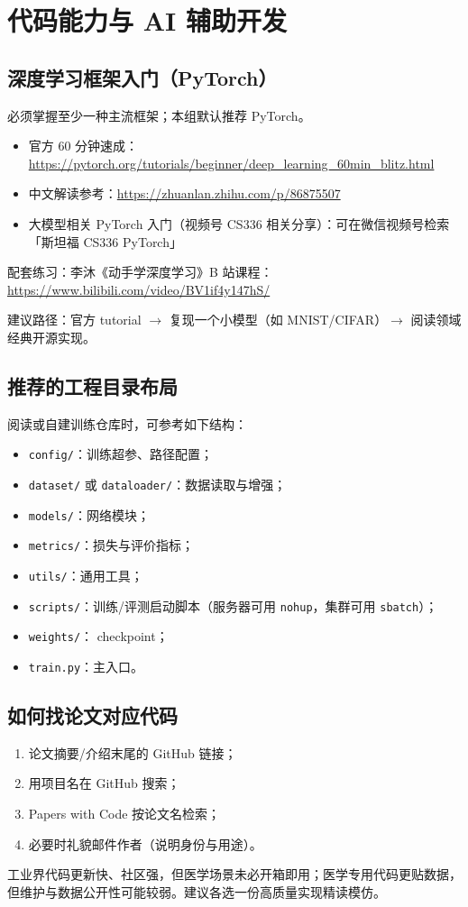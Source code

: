\section{代码能力与 AI 辅助开发}

\subsection{深度学习框架入门（PyTorch）}
必须掌握至少一种主流框架；本组默认推荐 PyTorch。
\begin{itemize}
  \item 官方 60 分钟速成：\url{https://pytorch.org/tutorials/beginner/deep_learning_60min_blitz.html}
  \item 中文解读参考：\url{https://zhuanlan.zhihu.com/p/86875507}
  \item 大模型相关 PyTorch 入门（视频号 CS336 相关分享）：可在微信视频号检索「斯坦福 CS336 PyTorch」
\end{itemize}
配套练习：李沐《动手学深度学习》B 站课程：\\
\url{https://www.bilibili.com/video/BV1if4y147hS/}

建议路径：官方 tutorial $\rightarrow$ 复现一个小模型（如 MNIST/CIFAR）$\rightarrow$ 阅读领域经典开源实现。

\subsection{推荐的工程目录布局}
阅读或自建训练仓库时，可参考如下结构：
\begin{itemize}
  \item \texttt{config/}：训练超参、路径配置；
  \item \texttt{dataset/} 或 \texttt{dataloader/}：数据读取与增强；
  \item \texttt{models/}：网络模块；
  \item \texttt{metrics/}：损失与评价指标；
  \item \texttt{utils/}：通用工具；
  \item \texttt{scripts/}：训练/评测启动脚本（服务器可用 \texttt{nohup}，集群可用 \texttt{sbatch}）；
  \item \texttt{weights/}： checkpoint；
  \item \texttt{train.py}：主入口。
\end{itemize}

\subsection{如何找论文对应代码}
\begin{enumerate}
  \item 论文摘要/介绍末尾的 GitHub 链接；
  \item 用项目名在 GitHub 搜索；
  \item Papers with Code 按论文名检索；
  \item 必要时礼貌邮件作者（说明身份与用途）。
\end{enumerate}
工业界代码更新快、社区强，但医学场景未必开箱即用；医学专用代码更贴数据，但维护与数据公开性可能较弱。建议各选一份高质量实现精读模仿。

